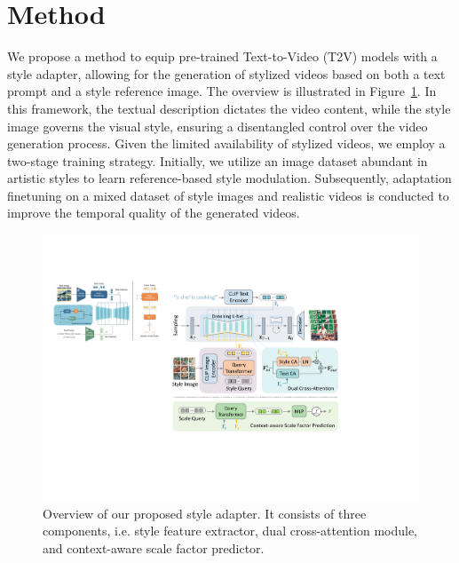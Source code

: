 \vspace{-0.6em}
\section{Method}
\label{sec:method}

We propose a method to equip pre-trained Text-to-Video (T2V) models with a style adapter, allowing for the generation of stylized videos based on both a text prompt and a style reference image. The overview is illustrated in Figure~\ref{fig:overview}. In this framework, the textual description dictates the video content, while the style image governs the visual style, ensuring a disentangled control over the video generation process.
Given the limited availability of stylized videos, we employ a two-stage training strategy. Initially, we utilize an image dataset abundant in artistic styles to learn reference-based style modulation. Subsequently, adaptation finetuning on a mixed dataset of style images and realistic videos is conducted to improve the temporal quality of the generated videos.


%
\begin{figure}[t]
    \centering
    \includegraphics[width=0.95\linewidth]{figures/overview2.pdf}
    \vspace{-0.35cm}
    \caption{Overview of our proposed style adapter. It consists of three components, i.e. style feature extractor, dual cross-attention module, and context-aware scale factor predictor.}
    \label{fig:overview}
    \vspace{-1.4em}
\end{figure}


